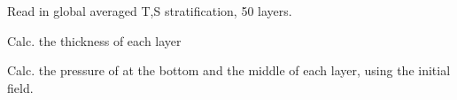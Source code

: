 
\been

\item Read in global averaged T,S stratification, 50 layers.
\item Calc. the thickness of each layer
\item Calc. the pressure of at the bottom and the middle of each layer, using the initial
field.

\enen
